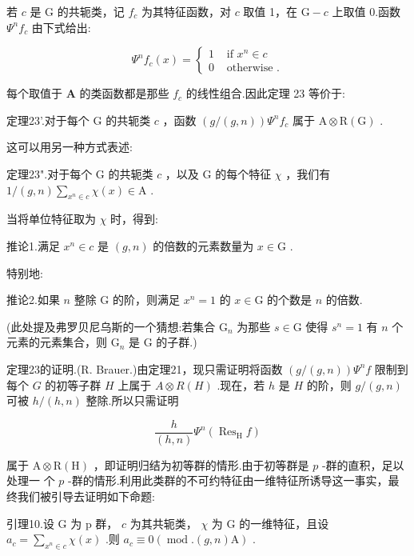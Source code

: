 \documentclass[10pt]{article}
\begin{document}
若 \(c\) 是 \(\mathrm{G}\) 的共轭类，记 \({f}_{c}\) 为其特征函数，对 \(c\) 取值 1，在 \(\mathrm{G} - c\) 上取值 0.函数 \({\Psi }^{n}{f}_{c}\) 由下式给出:

\[
{\Psi }^{n}{f}_{c}\left( x\right)  = \left\{  \begin{array}{ll} 1 & \text{ if }{x}^{n} \in  c \\  0 & \text{ otherwise }. \end{array}\right.
\]

每个取值于 \(\mathbf{A}\) 的类函数都是那些 \({f}_{c}\) 的线性组合.因此定理 23 等价于:

定理23’.对于每个 \(\mathrm{G}\) 的共轭类 \(c\) ，函数 \(\left( {g/\left( {g,n}\right) }\right) {\Psi }^{n}{f}_{c}\) 属于 \(\mathrm{A} \otimes  \mathrm{R}\left( \mathrm{G}\right)\) .

这可以用另一种方式表述:

定理23".对于每个 \(\mathrm{G}\) 的共轭类 \(c\) ，以及 \(\mathrm{G}\) 的每个特征 \(\chi\) ，我们有 \(1/\left( {g,n}\right) \mathop{\sum }\limits_{{{x}^{n} \in  c}}\chi \left( x\right)  \in  \mathrm{A}\) .

当将单位特征取为 \(\chi\) 时，得到:

推论1.满足 \({x}^{n} \in  c\) 是 \(\left( {g,n}\right)\) 的倍数的元素数量为 \(x \in  \mathrm{G}\) .

特别地:

推论2.如果 \(n\) 整除 \(\mathrm{G}\) 的阶，则满足 \({x}^{n} = 1\) 的 \(x \in  \mathrm{G}\) 的个数是 \(n\) 的倍数.

(此处提及弗罗贝尼乌斯的一个猜想:若集合 \({\mathrm{G}}_{n}\) 为那些 \(s \in  \mathrm{G}\) 使得 \({s}^{n} = 1\) 有 \(n\) 个元素的元素集合，则 \({\mathrm{G}}_{n}\) 是 \(\mathrm{G}\) 的子群.)

定理23的证明.(R. Brauer.)由定理21，现只需证明将函数 \(\left( {g/\left( {g,n}\right) }\right) {\Psi }^{n}f\) 限制到每个 \(G\) 的初等子群 \(H\) 上属于 \(A \otimes  R\left( H\right)\) .现在，若 \(h\) 是 \(H\) 的阶，则 \(g/\left( {g,n}\right)\) 可被 \(h/\left( {h,n}\right)\) 整除.所以只需证明

\[
\frac{h}{\left( h,n\right) }{\Psi }^{n}\left( {{\operatorname{Res}}_{\mathrm{H}}f}\right)
\]

属于 \(\mathrm{A} \otimes  \mathrm{R}\left( \mathrm{H}\right)\) ，即证明归结为初等群的情形.由于初等群是 \(p\) -群的直积，足以处理一 个 \(p\) -群的情形.利用此类群的不可约特征由一维特征所诱导这一事实，最终我们被引导去证明如下命题:

引理10.设 \(\mathrm{G}\) 为 p 群， \(c\) 为其共轭类， \(\chi\) 为 \(\mathrm{G}\) 的一维特征，且设 \({a}_{c} = \mathop{\sum }\limits_{{{x}^{n} \in  c}}\chi \left( x\right)\) .则 \({a}_{c} \equiv  0\left( {\operatorname{mod}.\left( {g,n}\right) \mathrm{A}}\right)\) .
\end{document}
